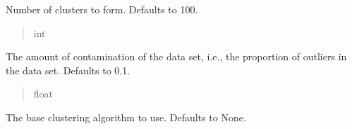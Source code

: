 \documentclass[letterpaper,10pt,english]{sphinxmanual}
\begin{document}
\begin{fulllineitems}
\begin{fulllineitems}
\label{\detokenize{modules:application.algorithms.cblof.CblofConfiguration.CblofConfiguration.n_clusters}}
\pysigstartsignatures
{}
\pysigstopsignatures
\sphinxAtStartPar
Number of clusters to form. Defaults to 100.
\begin{quote}\begin{description}
\sphinxAtStartPar
int

\end{description}\end{quote}

\end{fulllineitems}


\begin{fulllineitems}
\label{\detokenize{modules:application.algorithms.cblof.CblofConfiguration.CblofConfiguration.contamination}}
\pysigstartsignatures
{}
\pysigstopsignatures
\sphinxAtStartPar
The amount of contamination of the data set, i.e., the proportion of outliers in the data set. Defaults to 0.1.
\begin{quote}\begin{description}
\sphinxAtStartPar
float

\end{description}\end{quote}

\end{fulllineitems}


\begin{fulllineitems}
\label{\detokenize{modules:application.algorithms.cblof.CblofConfiguration.CblofConfiguration.clustering_estimator}}
\pysigstartsignatures
{}
\pysigstopsignatures
\sphinxAtStartPar
The base clustering algorithm to use. Defaults to None.


\end{fulllineitems}
\end{fulllineitems}
\end{document}
